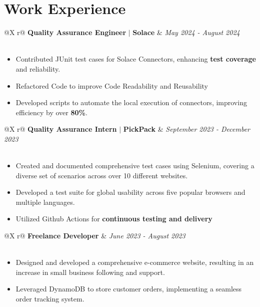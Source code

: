 \documentclass[a4paper,12pt]{article}
\begin{document}

\section{Work Experience}

\begin{tabularx}{\linewidth}{ @{}X r@{} }
    {\textbf{Quality Assurance Engineer}} $\vert$ {\textbf{Solace}} & \textit{May 2024 - August 2024} \\
     \\
\end{tabularx}
\begin{itemize} [nosep,leftmargin=*]
    \item Contributed JUnit test cases for Solace Connectors, enhancing \textbf{test coverage} and reliability.
    \item Refactored Code to improve Code Readability and Reusability 
    \item Developed scripts to automate the local execution of connectors, improving efficiency by over \textbf{80\%}.
\end{itemize}

\begin{tabularx}{\linewidth}{ @{}X r@{} }
    {\textbf{Quality Assurance Intern}} $\vert$ {\textbf{PickPack}} & \textit{September 2023 - December 2023} \\
     \\
\end{tabularx}
\begin{itemize}[nosep,leftmargin=*]
    \item Created and documented comprehensive test cases using Selenium, covering a diverse set of scenarios across over 10 different websites.
    \item Developed a test suite for global usability across five popular browsers and multiple languages.
    \item Utilized Github Actions for\textbf{ continuous testing and delivery}
\end{itemize}

\begin{tabularx}{\linewidth}{ @{}X r@{} }
    {\textbf{Freelance Developer}}  & \textit{June 2023 - August 2023} \\
     \\
\end{tabularx}
\begin{itemize}[nosep,leftmargin=*]
    \item Designed and developed a comprehensive e-commerce website, resulting in an increase in small business following and support. 
    \item Leveraged DynamoDB to store customer orders, implementing a seamless order tracking system.
\end{itemize}
\end{document}
